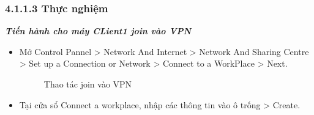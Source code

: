 \subsubsection*{4.1.1.3 Thực nghiệm}
 
\textbf{\textit{Tiến hành cho máy CLient1 join vào VPN}}
\begin{itemize}
      \item Mở Control Pannel > Network And Internet > Network And Sharing Centre > Set up a Connection or Network > Connect to a WorkPlace > Next. 
      \newpage
    \begin{figure}[htbp]
            \hfill
            \hfill
            \caption{Thao tác join vào VPN}
        \end{figure}
        
    \item Tại cửa sổ Connect a workplace, nhập các thông tin vào ô trống > Create.


\end{itemize}

